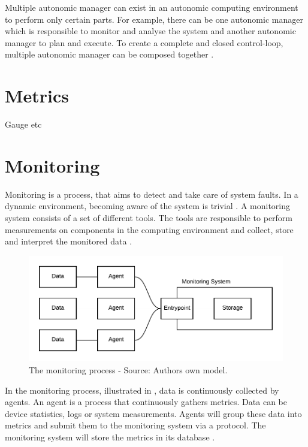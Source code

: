 Multiple autonomic manager can exist in an autonomic computing environment to perform only certain parts. For example, there can be one autonomic manager which is responsible to monitor and analyse the system and another autonomic manager to plan and execute. To create a complete and closed control-loop, multiple autonomic manager can be composed together \cite{Sinreich2006AnAB}.

\section{Metrics}
Gauge etc


\section{Monitoring}
Monitoring is a process, that aims to detect and take care of system faults. In a dynamic environment, becoming aware of the system is trivial \cite{Ligus2012EffMonitoring}.
A monitoring system consists of a set of different tools. The tools are responsible to perform measurements on components in the computing environment and collect, store and interpret the monitored data \cite{Ligus2012EffMonitoring}. 


\begin{figure}[h]
\centering
\includegraphics[scale=0.9]{images/02_theoretical_foundation/monitoring/monitoring_system}
\caption{The monitoring process - Source: Authors own model.}
\label{fig:mon_mon-system-process}
\end{figure}
In the monitoring process, illustrated in , data is continuously collected by agents. An agent is a process that continuously gathers metrics. Data can be device statistics, logs or system measurements. Agents will group these data into metrics and submit them to the monitoring system via a protocol. The monitoring system will store the metrics in its database \cite{Ligus2012EffMonitoring}.



